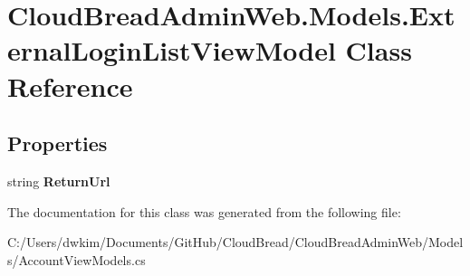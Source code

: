 \hypertarget{a00076}{}\section{Cloud\+Bread\+Admin\+Web.\+Models.\+External\+Login\+List\+View\+Model Class Reference}
\label{a00076}
\subsection*{Properties}
\begin{DoxyCompactItemize}
\item 
string {\bfseries Return\+Url}\hypertarget{a00076_aba1f7839a258af305afb7ae5282bf01f}{}\label{a00076_aba1f7839a258af305afb7ae5282bf01f}

\end{DoxyCompactItemize}


The documentation for this class was generated from the following file\+:\begin{DoxyCompactItemize}
\item 
C\+:/\+Users/dwkim/\+Documents/\+Git\+Hub/\+Cloud\+Bread/\+Cloud\+Bread\+Admin\+Web/\+Models/Account\+View\+Models.\+cs\end{DoxyCompactItemize}
